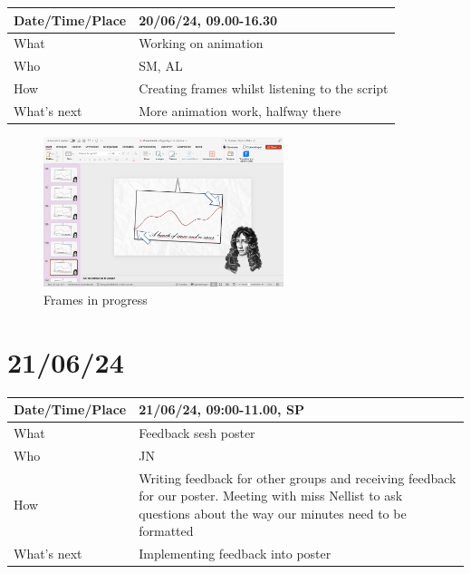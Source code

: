 \documentclass{article}
\begin{document}
\begin{table}[H]
\begin{tabular}{|p{1.5in}|p{4in}|}
\hline
Date/Time/Place & 20/06/24, 09.00-16.30 \\ \hline
What            & Working on animation \\ \hline
Who             & SM, AL \\ \hline
How             & Creating frames whilst listening to the script \\ \hline
What's next     & More animation work, halfway there \\ \hline
\end{tabular}
\end{table}

\begin{figure}[H]
    \centering
    \includegraphics[width=7cm]{Foto animatie.png}
    \caption{Frames in progress}   
\end{figure}

\section{21/06/24}

\begin{table}[H]
\begin{tabular}{|p{1.5in}|p{4in}|}
\hline
Date/Time/Place & 21/06/24, 09:00-11.00, SP \\ \hline
What            & Feedback sesh poster \\ \hline
Who             & JN \\ \hline
How             & Writing feedback for other groups and receiving feedback for our poster. Meeting with miss Nellist to ask questions about the way our minutes need to be formatted \\ \hline
What's next     & Implementing feedback into poster \\ \hline
\end{tabular}
\end{table}
\end{document}
